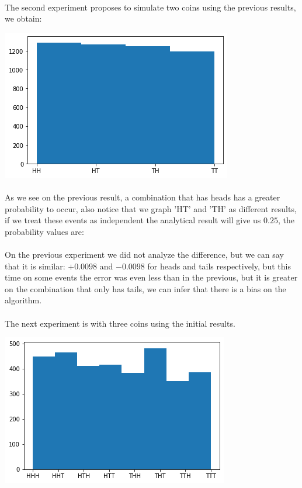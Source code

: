 \documentclass{article}
\begin{document}
\paragraph{} The second experiment proposes to simulate two coins using the previous results, we obtain:
\begin{center}
	\includegraphics[width=0.4\linewidth]{pairs.png}
\end{center}
\paragraph{}As we see on the previous result, a combination that has heads has a greater probability to occur, also notice that we graph 'HT' and 'TH' as different results, if we treat these events as independent the analytical result will give us $0.25$, the probability values are:
\begin{center}
\end{center}
\paragraph{}On the previous experiment we did not analyze the difference, but we can say that it is similar: $+0.0098$ and $-0.0098$ for heads and tails respectively, but this time on some events the error was even less than in the previous, but it is greater on the combination that only has tails, we can infer that there is a bias on the algorithm.
\paragraph{} The next experiment is with three coins using the initial results.
\begin{center}
	\includegraphics[width=0.4\linewidth]{triplets.png}
\end{center}
\begin{center}
\end{center}
\end{document}
